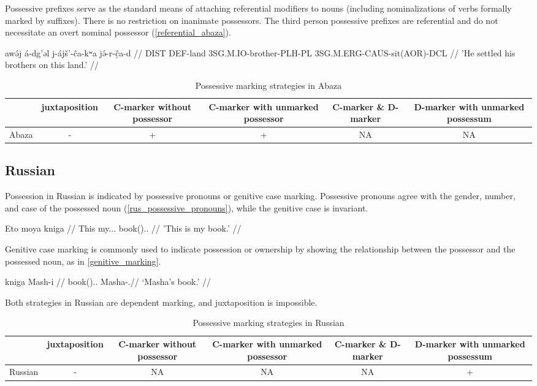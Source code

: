 Possessive prefixes serve as the standard means of attaching referential modifiers to nouns (including nominalizations of verbs formally marked by suffixes). There is no restriction on inanimate possessors. The third person possessive prefixes are referential and do not necessitate an overt nominal possessor (\ref{referential_abaza}).

\pex
\a\label{referential_abaza}
\begingl
\gla awə́j á-dg’əl j-ájš’-ĉa-kʷa jə́-r-ĉ̣a-d //
\glb DIST DEF-land 3SG.M.IO-brother-PLH-PL 3SG.M.ERG-CAUS-sit(AOR)-DCL //
\glft 'He settled his brothers on this land.' //
\endgl
\xe

\begin{table}[h!]
	\centering
	\small
	\begin{tabular}{@{}cccccc@{}}
		\toprule
		& juxtaposition & \parbox{2.5cm}{C-marker without possessor} & \parbox{2.75cm}{C-marker with unmarked possessor} & \parbox{1.75cm}{C-marker \& D-marker} & \parbox{3cm}{D-marker with unmarked possessum} \\ \midrule
		Abaza & - & + & + & NA & NA \\ \bottomrule
	\end{tabular}
	\caption{Possessive marking strategies in Abaza}
\end{table}


\subsection{Russian}

Possession in Russian is indicated by possessive pronouns or genitive case marking. Possessive pronouns agree with the gender, number, and case of the possessed noun (\ref{rus_possessive_pronouns}), while the genitive case is invariant.

\ex
\label{rus_possessive_pronouns}
\begingl
\gla Eto {moya kniga} //
\glb This my.\F.\Nom{}.\Sg{} book(\F).\Nom.\Sg{} //
\glft 'This is my book.' //
\endgl
\xe

Genitive case marking is commonly used to indicate possession or ownership by showing the relationship between the possessor and the possessed noun, as in \ref{genitive_marking}.

\ex
\label{genitive_marking}
\begingl
\gla  kniga {Mash-i} //
\glb book(\F).\Nom.\Sg{} Masha-\Gen.\Sg{}//
\glft `Masha's book.' //
\endgl
\xe

Both strategies in Russian are dependent marking, and juxtaposition is impossible.

\begin{table}[h!]
	\centering
	\small
	\begin{tabular}{@{}cccccc@{}}
		\toprule
		& juxtaposition & \parbox{2.5cm}{C-marker without possessor} & \parbox{2.75cm}{C-marker with unmarked possessor} & \parbox{1.75cm}{C-marker \& D-marker} & \parbox{3cm}{D-marker with unmarked possessum} \\ \midrule
		Russian & - & NA & NA & NA & + \\ \bottomrule
	\end{tabular}
	\caption{Possessive marking strategies in Russian}
\end{table}

